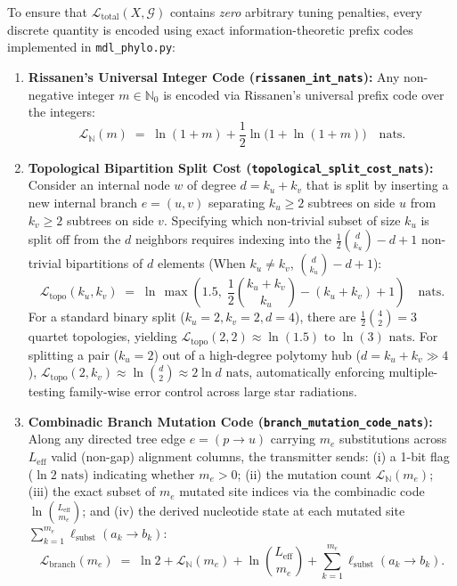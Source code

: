 \documentclass[11pt,a4paper]{article}
\begin{document}
To ensure that $\mathcal{L}_{\text{total}}(X, \mathcal{G})$ contains \emph{zero} arbitrary tuning penalties, every discrete quantity is encoded using exact information-theoretic prefix codes implemented in \texttt{mdl\_phylo.py}:

\begin{enumerate}[leftmargin=1.8em]
    \item \textbf{Rissanen's Universal Integer Code (\texttt{rissanen\_int\_nats}):}
    Any non-negative integer $m \in \mathbb{N}_0$ is encoded via Rissanen's universal prefix code over the integers:
    \begin{equation}
        \mathcal{L}_{\mathbb{N}}(m) \;=\; \ln(1 + m) + \frac{1}{2}\ln\big(1 + \ln(1 + m)\big) \quad \text{nats}.
    \end{equation}

    \item \textbf{Topological Bipartition Split Cost (\texttt{topological\_split\_cost\_nats}):}
    Consider an internal node $w$ of degree $d = k_u + k_v$ that is split by inserting a new internal branch $e = (u,v)$ separating $k_u \ge 2$ subtrees on side $u$ from $k_v \ge 2$ subtrees on side $v$. Specifying which non-trivial subset of size $k_u$ is split off from the $d$ neighbors requires indexing into the $\frac{1}{2}\binom{d}{k_u} - d + 1$ non-trivial bipartitions of $d$ elements (When $k_u \neq k_v$, $\binom{d}{k_u} - d + 1$):
    \begin{equation}
        \mathcal{L}_{\text{topo}}(k_u, k_v) \;=\; \ln\,\max\!\left(1.5,\; \frac{1}{2}\binom{k_u + k_v}{k_u} - (k_u + k_v) + 1\right) \quad \text{nats}.
        \label{eq:topo_cost}
    \end{equation}
    For a standard binary split ($k_u = 2, k_v = 2, d = 4$), there are $\frac{1}{2}\binom{4}{2} = 3$ quartet topologies, yielding $\mathcal{L}_{\text{topo}}(2,2) \approx \ln(1.5)\text{ to }\ln(3)\text{ nats}$. For splitting a pair ($k_u=2$) out of a high-degree polytomy hub ($d = k_u + k_v \gg 4$), $\mathcal{L}_{\text{topo}}(2, k_v) \approx \ln\binom{d}{2} \approx 2\ln d\text{ nats}$, automatically enforcing multiple-testing family-wise error control across large star radiations.

    \item \textbf{Combinadic Branch Mutation Code (\texttt{branch\_mutation\_code\_nats}):}
    Along any directed tree edge $e = (p \to u)$ carrying $m_e$ substitutions across $L_{\text{eff}}$ valid (non-gap) alignment columns, the transmitter sends: (i) a 1-bit flag ($\ln 2\text{ nats}$) indicating whether $m_e > 0$; (ii) the mutation count $\mathcal{L}_{\mathbb{N}}(m_e)$; (iii) the exact subset of $m_e$ mutated site indices via the combinadic code $\ln\binom{L_{\text{eff}}}{m_e}$; and (iv) the derived nucleotide state at each mutated site $\sum_{k=1}^{m_e} \ell_{\text{subst}}(a_k \to b_k)$:
    \begin{equation}
        \mathcal{L}_{\text{branch}}(m_e) \;=\; \ln 2 + \mathcal{L}_{\mathbb{N}}(m_e) + \ln\binom{L_{\text{eff}}}{m_e} + \sum_{k=1}^{m_e} \ell_{\text{subst}}(a_k \to b_k).
        \label{eq:branch_code}
    \end{equation}
\end{enumerate}
\end{document}
